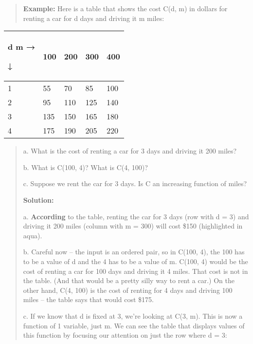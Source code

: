 \begin{quote}
\textbf{Example:} Here is a table that shows the cost C(d, m) in dollars
for renting a car for d days and driving it m miles:
\end{quote}

\begin{longtable}[]{@{}lllll@{}}
\toprule
\begin{minipage}[b]{0.19\columnwidth}\raggedright\strut
d m →

↓\strut
\end{minipage} & \begin{minipage}[b]{0.19\columnwidth}\raggedright\strut
100\strut
\end{minipage} & \begin{minipage}[b]{0.19\columnwidth}\raggedright\strut
200\strut
\end{minipage} & \begin{minipage}[b]{0.19\columnwidth}\raggedright\strut
300\strut
\end{minipage} & \begin{minipage}[b]{0.19\columnwidth}\raggedright\strut
400\strut
\end{minipage}\tabularnewline
\midrule
\endhead
1 & 55 & 70 & 85 & 100\tabularnewline
2 & 95 & 110 & 125 & 140\tabularnewline
3 & 135 & 150 & 165 & 180\tabularnewline
4 & 175 & 190 & 205 & 220\tabularnewline
\bottomrule
\end{longtable}

\begin{quote}
a. What is the cost of renting a car for 3 days and driving it 200
miles?

b. What is C(100, 4)? What is C(4, 100)?

c. Suppose we rent the car for 3 days. Is C an increasing function of
miles?

\textbf{Solution: }

a. \textbf{According} to the table, renting the car for 3 days (row with
d = 3) and driving it 200 miles (column with m = 300) will cost \$150
(highlighted in aqua).

b. Careful now -- the input is an ordered pair, so in C(100, 4), the 100
has to be a value of d and the 4 has to be a value of m. C(100, 4) would
be the cost of renting a car for 100 days and driving it 4 miles. That
cost is not in the table. (And that would be a pretty silly way to rent
a car.) On the other hand, C(4, 100) is the cost of renting for 4 days
and driving 100 miles -- the table says that would cost \$175.

c. If we know that d is fixed at 3, we're looking at C(3, m). This is
now a function of 1 variable, just m. We can see the table that displays
values of this function by focusing our attention on just the row where
d = 3:
\end{quote}

